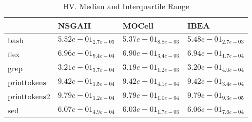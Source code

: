 \documentclass{article}
\begin{document}
\begin{table}
\caption{HV. Median and Interquartile Range}
\label{table: HV}
\centering
\begin{scriptsize}
\begin{tabular}{llll}
\hline & NSGAII & MOCell &  IBEA\\
\hline 
bash & \cellcolor{gray95}$  5.52e-01_{ 2.7e-03}$ & $  5.37e-01_{ 8.8e-03}$ & \cellcolor{gray25}$  5.48e-01_{ 2.7e-03}$ \\
flex & \cellcolor{gray95}$  6.96e-01_{ 9.4e-04}$ & $  6.90e-01_{ 3.4e-03}$ & \cellcolor{gray25}$  6.94e-01_{ 1.7e-04}$ \\
grep & \cellcolor{gray95}$  3.21e-01_{ 3.7e-04}$ & $  3.19e-01_{ 1.2e-03}$ & \cellcolor{gray25}$  3.20e-01_{ 4.0e-04}$ \\
printtokens & \cellcolor{gray95}$  9.42e-01_{ 1.5e-04}$ & $  9.42e-01_{ 4.1e-04}$ & \cellcolor{gray25}$  9.42e-01_{ 3.4e-04}$ \\
printtokens2 & \cellcolor{gray95}$  9.79e-01_{ 1.2e-04}$ & $  9.79e-01_{ 1.0e-04}$ & \cellcolor{gray25}$  9.79e-01_{ 9.3e-05}$ \\
sed & \cellcolor{gray95}$  6.07e-01_{ 4.9e-04}$ & $  6.03e-01_{ 1.7e-03}$ & \cellcolor{gray25}$  6.06e-01_{ 7.6e-04}$ \\
\hline
\end{tabular}
\end{scriptsize}
\end{table}
\end{document}

